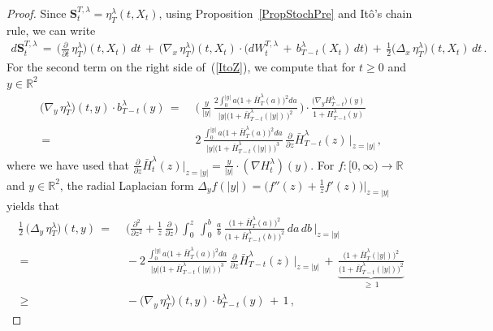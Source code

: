 \documentclass[10pt]{article}
\numberwithin{equation}{section}
\theoremstyle{definition}
\newcommand{\R}{{\mathbb R}}
\begin{document}
\begin{proof}
Since $ \mathbf{S}_{t}^{T,\lambda}=\eta_{T}^{\lambda}(t,X_t) $, using Proposition~\ref{PropStochPre} and It\^o's chain rule, we can write
\begin{align}\label{ItoZ}
    d\mathbf{S}_{t}^{T,\lambda}\,=\,\Big(\frac{\partial}{\partial t}\,\eta_{T}^{\lambda} \Big)  (t,X_t)\,dt\,+\,\big(\nabla_x \,\eta_{T}^{\lambda}\big)(t,X_t) \cdot \Big(  dW^{T,\lambda}_t\,+\,b^{\lambda}_{T-t}(X_t)\,dt   \Big)\,+\,\frac{1}{2}\big(\Delta_x \,\eta_{T}^{\lambda}\big)(t,X_t)\,dt\,.
  \end{align}  
 For the second term on the right side of~(\ref{ItoZ}), we compute that for $t\geq 0$ and $y\in \R^2$
\begin{align}\label{NablaEta}
 \big(\nabla_y \,\eta_{T}^{\lambda}\big)(t,y) \cdot b^{\lambda}_{T-t}(y)\,=\,&\, \Bigg(\,\frac{y}{|y|}\,\frac{2\int_0^{|y|} a\big( 1+\bar{H}_{T}^{\lambda}(a)\big)^2    da  }{|y|\big( 1+\bar{H}_{T-t}^{\lambda}(|y|)\,\big)^2   }\,\Bigg) \cdot \frac{  \big(\nabla_y H_{T-t}^{\lambda}\big)(y)  }{1+H_{T-t}^{\lambda}(y)  } \nonumber \\
 \,=\,&\,2\,\frac{\int_0^{|y|} a\big( 1+\bar{H}_{T}^{\lambda}(a)\big)^2    da  }{|y| \big( 1+\bar{H}_{T-t}^{\lambda}(|y|)\big)^3   }  \,\frac{\partial}{\partial z}\bar{H}_{T-t}^{\lambda}(z)\,\Bigg|_{z=|y|}  \,,
\end{align}
where we have used that $\frac{\partial}{\partial z}\bar{H}_{t}^{\lambda}(z)\big|_{z=|y|}=\frac{y}{|y|}\cdot (\nabla H_{t}^{\lambda})(y) $.  For $f:[0,\infty)\rightarrow \R$ and $y\in \R^2$, the radial Laplacian form $\Delta_yf(|y|)=\big(f''(z)+\frac{1}{z} f'(z) \big)\big|_{z=|y|} $ yields that
\begin{align}\label{IneqEta1}
  \frac{1}{2} \, \big(\Delta_y \,\eta_{T}^{\lambda}\big)(t,y)\,=\,&\,\bigg( \frac{\partial^2}{\partial z^2}+\frac{1}{z}\,\frac{\partial}{\partial z}   \bigg) \,\int_0^{z}\,  \int_0^b\, \frac{a}{b}\,\frac{\big( 1+\bar{H}_{T}^{\lambda}(a)\big)^2     }{\big( 1+\bar{H}_{T-t}^{\lambda}(b)\big)^2      }\,da \,db \,\Bigg|_{z=|y|} \nonumber \\
    \,=\,&\, - 2 \, \frac{\int_0^{|y|} a\big( 1+\bar{H}_{T}^{\lambda}(a)\big)^2    da   }{|y| \big( 1+\bar{H}_{T-t}^{\lambda}(|y|)\big)^3   } \,\frac{\partial}{\partial z}\bar{H}_{T-t}^{\lambda}(z)\,\Bigg|_{z=|y|}  \,+\,\underbrace{\frac{ \big( 1+\bar{H}_{T}^{\lambda}(|y|)\big)^2      }{\big( 1+\bar{H}_{T-t}^{\lambda}(|y|)\big)^2   }}_{\geq \,1}\nonumber \\ \,\geq \,&\, -\big(\nabla_y\, \eta_{T}^{\lambda}\big)(t,y) \cdot b^{\lambda}_{T-t}(y)\,+\,1\,,

\end{align}
\end{proof}
\end{document}
